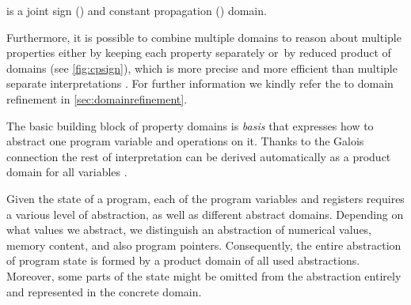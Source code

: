 \begin{marginfigure}%
    \centering
{}
    \caption{ is a joint sign () and constant propagation () domain.}
    \label{fig:cpsign}%
\end{marginfigure}%

Furthermore, it is possible to combine multiple domains to
reason about multiple properties either by keeping each property separately
or~by reduced product of domains (see \autoref{fig:cpsign}), which is more
precise and more efficient than multiple separate interpretations
\cite{Cousot2011b}.  For further information we kindly refer the to domain
refinement in \autoref{sec:domainrefinement}.

The basic building block of property domains is \emph{basis} that expresses how
to abstract one program variable and operations on it.  Thanks to the Galois
connection the rest of interpretation can be derived automatically as a product
domain for all variables \cite{Mine2004Thesis}.

Given the state of a program, each of the program variables and registers
requires a various level of abstraction, as well as different abstract domains.
Depending on what values we abstract, we distinguish an abstraction of numerical
values, memory content, and also program pointers. Consequently, the entire
abstraction of program state is formed by a product domain of all used
abstractions. Moreover, some parts of the state might be omitted from the
abstraction entirely and represented in the concrete domain.

